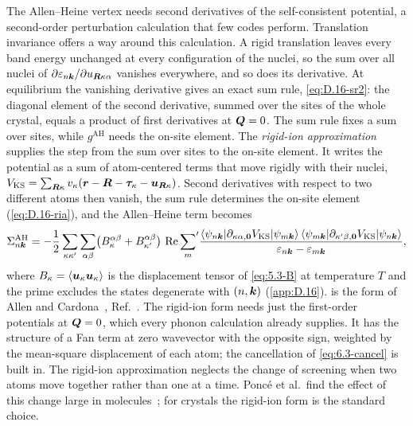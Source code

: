 The Allen--Heine vertex needs second derivatives of the self-consistent potential, a second-order perturbation calculation that few codes perform. Translation invariance offers a way around this calculation. A rigid translation leaves every band energy unchanged at every configuration of the nuclei, so the sum over all nuclei of $\partial\varepsilon_{n\bm{k}}/\partial u_{\bm{R}\kappa\alpha}$ vanishes everywhere, and so does its derivative. At equilibrium the vanishing derivative gives an exact sum rule, \cref{eq:D.16-sr2}: the diagonal element of the second derivative, summed over the sites of the whole crystal, equals a product of first derivatives at $\bm{Q} = 0$. The sum rule fixes a sum over sites, while $g^{\mathrm{AH}}$ needs the on-site element. The \emph{rigid-ion approximation} supplies the step from the sum over sites to the on-site element. It writes the potential as a sum of atom-centered terms that move rigidly with their nuclei, $V_{\mathrm{KS}} = \sum_{\bm{R}\kappa}v_\kappa(\bm{r} - \bm{R} - \bm{\tau}_\kappa - \bm{u}_{\bm{R}\kappa})$. Second derivatives with respect to two different atoms then vanish, the sum rule determines the on-site element (\cref{eq:D.16-ria}), and the Allen--Heine term becomes
\begin{equation}
  \Sigma^{\mathrm{AH}}_{n\bm{k}} = -\frac12\sum_{\kappa\kappa'}\sum_{\alpha\beta}\bigl(B^{\alpha\beta}_\kappa + B^{\alpha\beta}_{\kappa'}\bigr)\,\operatorname{Re}{\sum_{m}}'\frac{\langle\psi_{n\bm{k}}|\partial_{\kappa\alpha,\bm{0}}V_{\mathrm{KS}}|\psi_{m\bm{k}}\rangle\,\langle\psi_{m\bm{k}}|\partial_{\kappa'\beta,\bm{0}}V_{\mathrm{KS}}|\psi_{n\bm{k}}\rangle}{\varepsilon_{n\bm{k}} - \varepsilon_{m\bm{k}}} ,
  \label{eq:6.3-ria}
\end{equation}
where $B_\kappa = \langle\bm{u}_\kappa\bm{u}_\kappa\rangle$ is the displacement tensor of \cref{eq:5.3-B} at temperature $T$ and the prime excludes the states degenerate with $(n,\bm{k})$ (\cref{app:D.16}).  is the form of Allen and Cardona~\cite{allen1981temperature}, Ref.~\cite[Eqs.~(195)--(198)]{giustino2017electron}. The rigid-ion form needs just the first-order potentials at $\bm{Q} = 0$, which every phonon calculation already supplies. It has the structure of a Fan term at zero wavevector with the opposite sign, weighted by the mean-square displacement of each atom; the cancellation of \cref{eq:6.3-cancel} is built in. The rigid-ion approximation neglects the change of screening when two atoms move together rather than one at a time. Poncé et al.\ find the effect of this change large in molecules~\cite{ponce2015temperature}; for crystals the rigid-ion form is the standard choice.

